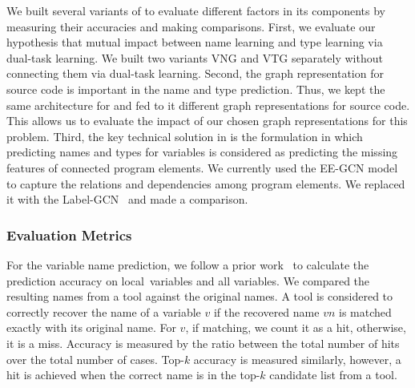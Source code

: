 We built several variants of {\tool} to evaluate different factors in
its components by measuring their accuracies and making comparisons.
First, we evaluate our hypothesis that mutual impact between name
learning and type learning via dual-task learning. We built two
variants VNG and VTG separately without connecting them via dual-task
learning. Second, the graph representation for source code is
important in the name and type prediction. Thus, we kept the same
architecture for {\tool} and fed to it different graph representations
for source code. This allows us to evaluate the impact of our chosen
graph representations for this problem. Third, the key technical
solution in {\tool} is the formulation in which predicting names and
types for variables is considered as predicting the missing features
of connected program elements. We currently used the EE-GCN model to
capture the relations and dependencies among program elements. We
replaced it with the Label-GCN~\cite{label-gcn} and made a comparison.


\subsubsection*{Evaluation Metrics}

For the variable name prediction, we follow a prior work~\cite{icse19}
to calculate the prediction accuracy on local~variables and all
variables. We compared the resulting names from a tool against the
original names. A tool is considered to correctly
recover the name of a variable $v$ if the recovered name $vn$ is
matched exactly with its original name. For $v$, if matching, we count
it as a hit, otherwise, it is a miss. Accuracy is measured by the
ratio between the total number of hits over the total number of
cases. Top-$k$ accuracy is measured similarly, however, a hit is
achieved when the correct name is in the top-$k$ candidate list from a
tool.

